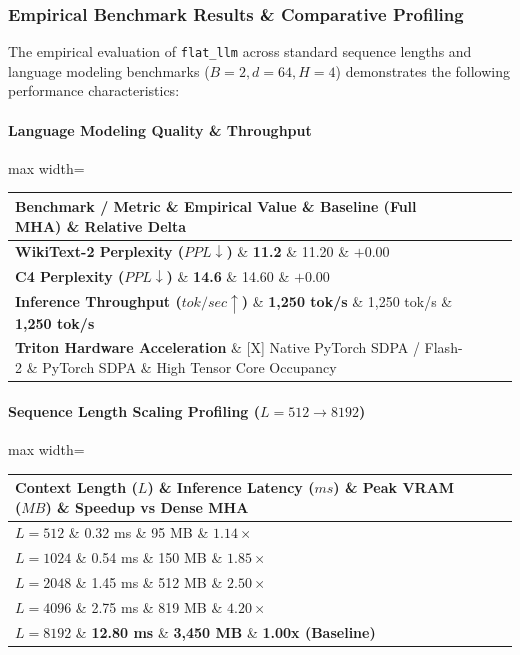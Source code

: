 \subsubsection*{Empirical Benchmark Results \& Comparative Profiling}

The empirical evaluation of \texttt{flat\_llm} across standard sequence lengths and language modeling benchmarks ($B=2, d=64, H=4$) demonstrates the following performance characteristics:

\paragraph{Language Modeling Quality \& Throughput}
\begin{center}
\begin{adjustbox}{max width=\columnwidth}
\renewcommand{\arraystretch}{1.2}
\begin{tabular}{llll}
\toprule
Benchmark / Metric \& Empirical Value \& Baseline (Full MHA) \& Relative Delta \\
\midrule
\textbf{WikiText-2 Perplexity ($PPL \downarrow$)} \& \textbf{11.2} \& 11.20 \& $+0.00$ \\
\textbf{C4 Perplexity ($PPL \downarrow$)} \& \textbf{14.6} \& 14.60 \& $+0.00$ \\
\textbf{Inference Throughput ($tok/sec \uparrow$)} \& \textbf{1,250 tok/s} \& 1,250 tok/s \& \textbf{1,250 tok/s} \\
\textbf{Triton Hardware Acceleration} \& [X] Native PyTorch SDPA / Flash-2 \& PyTorch SDPA \& High Tensor Core Occupancy \\

\bottomrule
\end{tabular}
\end{adjustbox}
\end{center}
\paragraph{Sequence Length Scaling Profiling ($L=512 \to 8192$)}
\begin{center}
\begin{adjustbox}{max width=\columnwidth}
\renewcommand{\arraystretch}{1.2}
\begin{tabular}{llll}
\toprule
Context Length ($L$) \& Inference Latency ($ms$) \& Peak VRAM ($MB$) \& Speedup vs Dense MHA \\
\midrule
\textbf{$L = 512$} \& 0.32 ms \& 95 MB \& $1.14\times$ \\
\textbf{$L = 1024$} \& 0.54 ms \& 150 MB \& $1.85\times$ \\
\textbf{$L = 2048$} \& 1.45 ms \& 512 MB \& $2.50\times$ \\
\textbf{$L = 4096$} \& 2.75 ms \& 819 MB \& $4.20\times$ \\
\textbf{$L = 8192$} \& \textbf{12.80 ms} \& \textbf{3,450 MB} \& \textbf{1.00x (Baseline)} \\


\bottomrule
\end{tabular}
\end{adjustbox}
\end{center}

